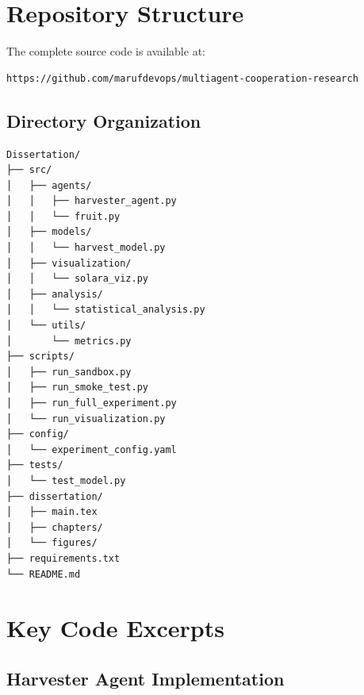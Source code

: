 
\section{Repository Structure}

The complete source code is available at:

\begin{verbatim}
https://github.com/marufdevops/multiagent-cooperation-research
\end{verbatim}

\subsection{Directory Organization}

\begin{verbatim}
Dissertation/
├── src/
│   ├── agents/
│   │   ├── harvester_agent.py
│   │   └── fruit.py
│   ├── models/
│   │   └── harvest_model.py
│   ├── visualization/
│   │   └── solara_viz.py
│   ├── analysis/
│   │   └── statistical_analysis.py
│   └── utils/
│       └── metrics.py
├── scripts/
│   ├── run_sandbox.py
│   ├── run_smoke_test.py
│   ├── run_full_experiment.py
│   └── run_visualization.py
├── config/
│   └── experiment_config.yaml
├── tests/
│   └── test_model.py
├── dissertation/
│   ├── main.tex
│   ├── chapters/
│   └── figures/
├── requirements.txt
└── README.md
\end{verbatim}

\section{Key Code Excerpts}

\subsection{Harvester Agent Implementation}

